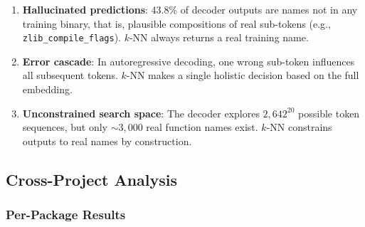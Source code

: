 \documentclass[sigconf,nonacm]{acmart}
\begin{document}
\begin{enumerate}
    \item \textbf{Hallucinated predictions}: 43.8\% of decoder outputs are names not in any training binary, that is, plausible compositions of real sub-tokens (e.g., \texttt{zlib\_compile\_flags}). $k$-NN always returns a real training name.

    \item \textbf{Error cascade}: In autoregressive decoding, one wrong sub-token influences all subsequent tokens. $k$-NN makes a single holistic decision based on the full embedding.

    \item \textbf{Unconstrained search space}: The decoder explores $2{,}642^{20}$ possible token sequences, but only ${\sim}3{,}000$ real function names exist. $k$-NN constrains outputs to real names by construction.
\end{enumerate}

\subsection{Cross-Project Analysis}

\subsubsection{Per-Package Results}
\end{document}
